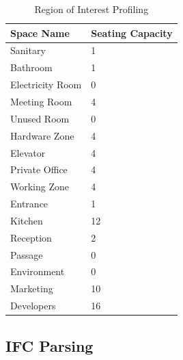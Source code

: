 \documentclass[conference]{IEEEtran}
\begin{document}
\begin{table}[]
\caption{Region of Interest Profiling}
\label{table:roiprofiling}
\centering
\begin{tabular}{|l|l|}
\hline
Space Name       & Seating Capacity \\ \hline
Sanitary     &  1    \\ \hline
Bathroom       & 1   \\ \hline
Electricity Room    & 0    \\ \hline
Meeting Room & 4   \\ \hline
Unused Room & 0 \\ \hline
Hardware Zone & 4   \\ \hline
Elevator & 4   \\ \hline
Private Office & 4 \\ \hline
Working Zone & 4 \\ \hline
Entrance & 1 \\ \hline
Kitchen & 12   \\ \hline
Reception & 2  \\ \hline
 {Passage}          &  {0}   \\ \hline
 {Environment}      &  {0}   \\ \hline
 {Marketing}        &  {10}  \\ \hline
 {Developers}       &  {16}   \\ \hline
\end{tabular}
\end{table}

\subsection{IFC Parsing}
\end{document}
